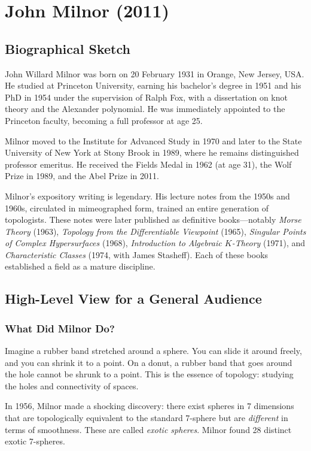 \chapter{John Milnor (2011)}

\section{Biographical Sketch}

John Willard Milnor was born on 20 February 1931 in Orange, New Jersey, USA. He studied at Princeton University, earning his bachelor's degree in 1951 and his PhD in 1954 under the supervision of Ralph Fox, with a dissertation on knot theory and the Alexander polynomial. He was immediately appointed to the Princeton faculty, becoming a full professor at age 25.

Milnor moved to the Institute for Advanced Study in 1970 and later to the State University of New York at Stony Brook in 1989, where he remains distinguished professor emeritus. He received the Fields Medal in 1962 (at age 31), the Wolf Prize in 1989, and the Abel Prize in 2011.

Milnor's expository writing is legendary. His lecture notes from the 1950s and 1960s, circulated in mimeographed form, trained an entire generation of topologists. These notes were later published as definitive books---notably \emph{Morse Theory} (1963), \emph{Topology from the Differentiable Viewpoint} (1965), \emph{Singular Points of Complex Hypersurfaces} (1968), \emph{Introduction to Algebraic $K$-Theory} (1971), and \emph{Characteristic Classes} (1974, with James Stasheff). Each of these books established a field as a mature discipline.

\section{High-Level View for a General Audience}

\subsection{What Did Milnor Do?}

Imagine a rubber band stretched around a sphere. You can slide it around freely, and you can shrink it to a point. On a donut, a rubber band that goes around the hole cannot be shrunk to a point. This is the essence of topology: studying the holes and connectivity of spaces.

In 1956, Milnor made a shocking discovery: there exist spheres in 7 dimensions that are topologically equivalent to the standard 7-sphere but are \emph{different} in terms of smoothness. These are called \emph{exotic spheres}. Milnor found 28 distinct exotic 7-spheres.

